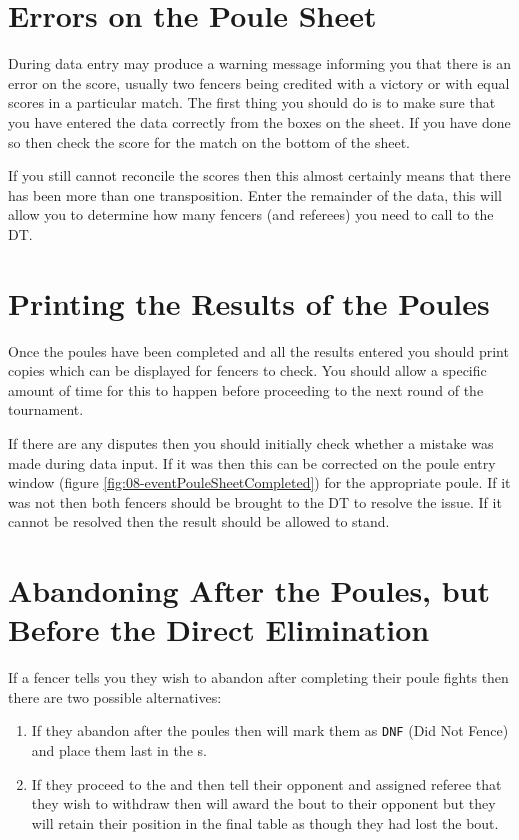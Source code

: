 \documentclass[a4paper,11pt]{memoir}
\begin{document}
\section{Errors on the Poule Sheet}

During data entry \fencingtime{} may produce a warning message informing you that there is an error on the score, usually two fencers being credited with a victory or with equal scores in a particular match. The first thing you should do is to make sure that you have entered the data correctly from the boxes on the sheet. If you have done so then check the score for the match on the bottom of the sheet.

If you still cannot reconcile the scores then this almost certainly means that there has been more than one transposition. Enter the remainder of the data, this will allow you to determine how many fencers (and referees) you need to call to the DT.

\section{Printing the Results of the Poules}

Once the poules have been completed and all the results entered you should print copies which can be displayed for fencers to check. You should allow a specific amount of time for this to happen before proceeding to the next round of the tournament.

If there are any disputes then you should initially check whether a mistake was made during data input. If it was then this can be corrected on the poule entry window (figure \ref{fig:08-eventPouleSheetCompleted}) for the appropriate poule. If it was not then both fencers should be brought to the DT to resolve the issue. If it cannot be resolved then the result should be allowed to stand.

\section{Abandoning After the Poules, but Before the Direct Elimination}

If a fencer tells you they wish to abandon after completing their poule fights then there are two possible alternatives:

\begin{enumerate}
 \item If they abandon after the poules then \fencingtime{} will mark them as \texttt{DNF} (Did Not Fence) and place them last in the s.
 \item If they proceed to the  and then tell their opponent and assigned referee that they wish to withdraw then \fencingtime{} will award the bout to their opponent but they will retain their position in the final  table as though they had lost the bout.
\end{enumerate}
\end{document}
